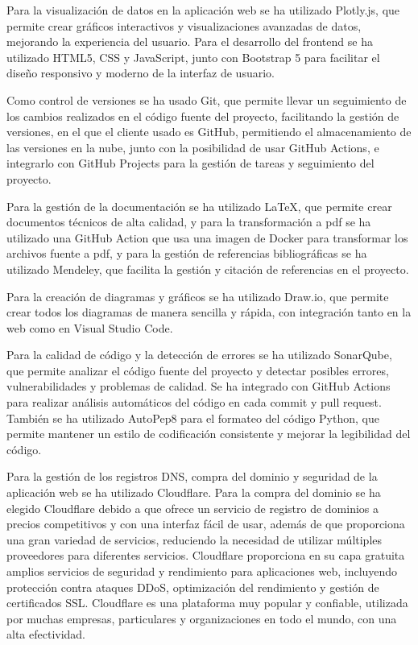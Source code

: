 Para la visualización de datos en la aplicación web se ha utilizado Plotly.js, que permite crear gráficos interactivos y visualizaciones avanzadas de datos, mejorando la experiencia del usuario. Para el desarrollo del frontend se ha utilizado HTML5, CSS y JavaScript, junto con Bootstrap 5 para facilitar el diseño responsivo y moderno de la interfaz de usuario.

Como control de versiones se ha usado Git, que permite llevar un seguimiento de los cambios realizados en el código fuente del proyecto, facilitando la gestión de versiones, en el que el cliente usado es GitHub, permitiendo el almacenamiento de las versiones en la nube, junto con la posibilidad de usar GitHub Actions, e integrarlo con GitHub Projects para la gestión de tareas y seguimiento del proyecto. 

Para la gestión de la documentación se ha utilizado LaTeX, que permite crear documentos técnicos de alta calidad, y para la transformación a pdf se ha utilizado una GitHub Action que usa una imagen de Docker para transformar los archivos fuente a pdf, y para la gestión de referencias bibliográficas se ha utilizado Mendeley, que facilita la gestión y citación de referencias en el proyecto.

Para la creación de diagramas y gráficos se ha utilizado Draw.io, que permite crear todos los diagramas de manera sencilla y rápida, con integración tanto en la web como en Visual Studio Code.

Para la calidad de código y la detección de errores se ha utilizado SonarQube, que permite analizar el código fuente del proyecto y detectar posibles errores, vulnerabilidades y problemas de calidad. Se ha integrado con GitHub Actions para realizar análisis automáticos del código en cada commit y pull request. También se ha utilizado AutoPep8 para el formateo del código Python, que permite mantener un estilo de codificación consistente y mejorar la legibilidad del código.

Para la gestión de los registros DNS, compra del dominio y seguridad de la aplicación web se ha utilizado Cloudflare. Para la compra del dominio se ha elegido Cloudflare debido a que ofrece un servicio de registro de dominios a precios competitivos y con una interfaz fácil de usar, además de que proporciona una gran variedad de servicios, reduciendo la necesidad de utilizar múltiples proveedores para diferentes servicios. Cloudflare proporciona en su capa gratuita amplios servicios de seguridad y rendimiento para aplicaciones web, incluyendo protección contra ataques DDoS, optimización del rendimiento y gestión de certificados SSL. Cloudflare es una plataforma muy popular y confiable, utilizada por muchas empresas, particulares y organizaciones en todo el mundo, con una alta efectividad. ~\cite{Nadeem2023,Adhar2023}

